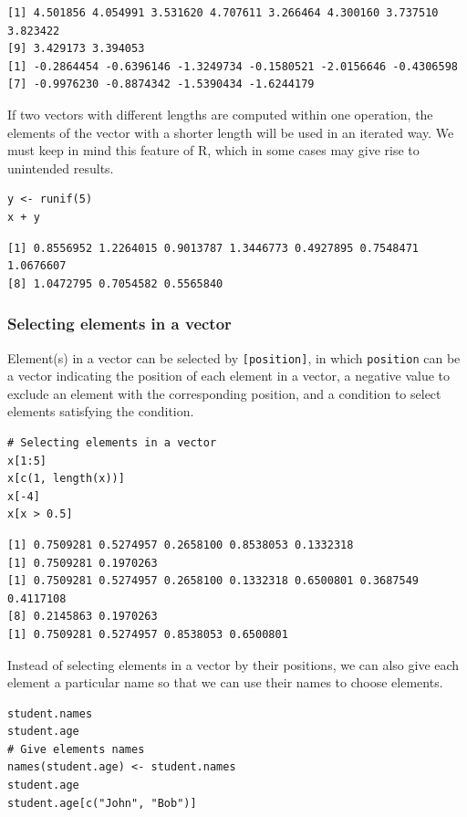 \documentclass[a4paper,11pt]{article}
\begin{document}
\begin{verbatim}
[1] 4.501856 4.054991 3.531620 4.707611 3.266464 4.300160 3.737510 3.823422
[9] 3.429173 3.394053
[1] -0.2864454 -0.6396146 -1.3249734 -0.1580521 -2.0156646 -0.4306598
[7] -0.9976230 -0.8874342 -1.5390434 -1.6244179
\end{verbatim}

If two vectors with different lengths are computed within one
operation, the elements of the vector with a shorter length will be
used in an iterated way. We must keep in mind this feature of R, which
in some cases may give rise to unintended results.

\begin{verbatim}
y <- runif(5)
x + y
\end{verbatim}

\begin{verbatim}
[1] 0.8556952 1.2264015 0.9013787 1.3446773 0.4927895 0.7548471 1.0676607
[8] 1.0472795 0.7054582 0.5565840
\end{verbatim}

\subsubsection*{Selecting elements in a vector}
\label{sec:org1911752}

Element(s) in a vector can be selected by \texttt{[position]}, in which
\texttt{position} can be a vector indicating the position of each element in
a vector, a negative value to exclude an element with the
corresponding position, and a condition to select elements satisfying
the condition.

\begin{verbatim}
# Selecting elements in a vector
x[1:5]
x[c(1, length(x))]
x[-4]
x[x > 0.5]
\end{verbatim}

\begin{verbatim}
[1] 0.7509281 0.5274957 0.2658100 0.8538053 0.1332318
[1] 0.7509281 0.1970263
[1] 0.7509281 0.5274957 0.2658100 0.1332318 0.6500801 0.3687549 0.4117108
[8] 0.2145863 0.1970263
[1] 0.7509281 0.5274957 0.8538053 0.6500801
\end{verbatim}

Instead of selecting elements in a vector by their positions, we can
also give each element a particular name so that we can use their
names to choose elements.

\begin{verbatim}
student.names
student.age
# Give elements names
names(student.age) <- student.names
student.age
student.age[c("John", "Bob")]
\end{verbatim}
\end{document}
